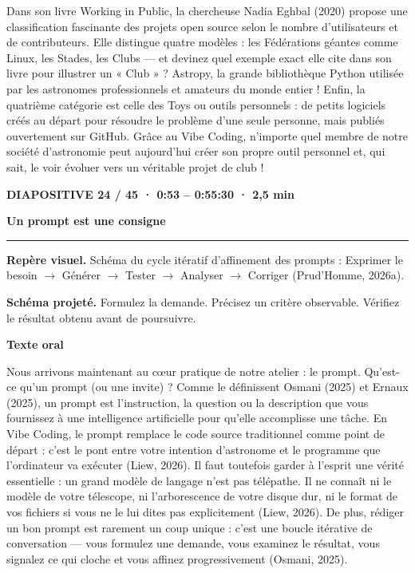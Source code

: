 \documentclass[10pt,letterpaper]{article}
\newcommand{\repere}[1]{\textcolor{accent}{\bfseries #1}\par}
\begin{document}
Dans son livre Working in Public, la chercheuse Nadia Eghbal (2020) propose une classification fascinante des projets open source selon le nombre d'utilisateurs et de contributeurs. Elle distingue quatre modèles : les Fédérations géantes comme Linux, les Stades, les Clubs — et devinez quel exemple exact elle cite dans son livre pour illustrer un « Club » ? Astropy, la grande bibliothèque Python utilisée par les astronomes professionnels et amateurs du monde entier ! Enfin, la quatrième catégorie est celle des Toys ou outils personnels : de petits logiciels créés au départ pour résoudre le problème d'une seule personne, mais publiés ouvertement sur GitHub. Grâce au Vibe Coding, n'importe quel membre de notre société d'astronomie peut aujourd'hui créer son propre outil personnel et, qui sait, le voir évoluer vers un véritable projet de club !\par

\clearpage\repere{DIAPOSITIVE 24 / 45 · 0:53 – 0:55:30 · 2,5 min}

{\Large\bfseries Un prompt est une consigne\par}

\smallskip\hrule\smallskip

{\small\textbf{Repère visuel.} Schéma du cycle itératif d'affinement des prompts : Exprimer le besoin \(\rightarrow\) Générer \(\rightarrow\) Tester \(\rightarrow\) Analyser \(\rightarrow\) Corriger (Prud'Homme, 2026a).\par}

\textbf{Schéma projeté.} Formulez la demande. Précisez un critère observable. Vérifiez le résultat obtenu avant de poursuivre.\par

\par\medskip\repere{Texte oral}

Nous arrivons maintenant au cœur pratique de notre atelier : le prompt. Qu'est-ce qu'un prompt (ou une invite) ? Comme le définissent Osmani (2025) et Ernaux (2025), un prompt est l'instruction, la question ou la description que vous fournissez à une intelligence artificielle pour qu'elle accomplisse une tâche. En Vibe Coding, le prompt remplace le code source traditionnel comme point de départ : c'est le pont entre votre intention d'astronome et le programme que l'ordinateur va exécuter (Liew, 2026). Il faut toutefois garder à l'esprit une vérité essentielle : un grand modèle de langage n'est pas télépathe. Il ne connaît ni le modèle de votre télescope, ni l'arborescence de votre disque dur, ni le format de vos fichiers si vous ne le lui dites pas explicitement (Liew, 2026). De plus, rédiger un bon prompt est rarement un coup unique : c'est une boucle itérative de conversation — vous formulez une demande, vous examinez le résultat, vous signalez ce qui cloche et vous affinez progressivement (Osmani, 2025).\par
\end{document}
